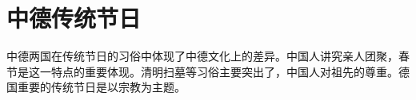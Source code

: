 \section{中德传统节日}

中德两国在传统节日的习俗中体现了中德文化上的差异。中国人讲究亲人团聚，春节是这一特点的重要体现。清明扫墓等习俗主要突出了，中国人对祖先的尊重。德国重要的传统节日是以宗教为主题。
